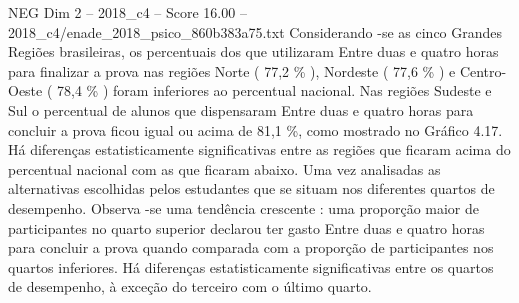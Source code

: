 \begin{textsample}{NEG Dim 2 – 2018\_c4 – Score 16.00 – 2018\_c4/enade\_2018\_psico\_860b383a75.txt}
Considerando -se as cinco Grandes Regiões brasileiras, os percentuais dos que utilizaram Entre duas e quatro horas para finalizar a prova nas regiões Norte ( 77,2 \% ), Nordeste ( 77,6 \% ) e Centro-Oeste ( 78,4 \% ) foram inferiores ao percentual nacional.
Nas regiões Sudeste e Sul o percentual de alunos que dispensaram Entre duas e quatro horas para concluir a prova ficou igual ou acima de 81,1 \%, como mostrado no Gráfico 4.17.
Há diferenças estatisticamente significativas entre as regiões que ficaram acima do percentual nacional com as que ficaram abaixo.
Uma vez analisadas as alternativas escolhidas pelos estudantes que se situam nos diferentes quartos de desempenho.
Observa -se uma tendência crescente : uma proporção maior de participantes no quarto superior declarou ter gasto Entre duas e quatro horas para concluir a prova quando comparada com a proporção de participantes nos quartos inferiores.
Há diferenças estatisticamente significativas entre os quartos de desempenho, à exceção do terceiro com o último quarto.

\end{textsample}
